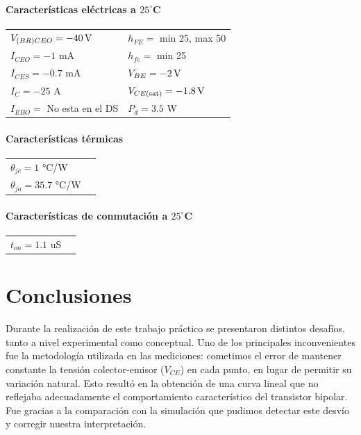 \documentclass[chaptersright]{informeutn}
\begin{document}
    \subsubsection{Características eléctricas a $25^\circ$C}
    \begin{tabular}{ll}
    $V_{(BR)CEO} = -40 \,\mathrm{V}$         & \hspace{2cm} $h_{FE} =$ min 25, max 50 \\
    $I_{CEO} = -1$ mA            & \hspace{2cm} $h_{fe} = $ min 25  \\
    $I_{CES} = -0.7$ mA               & \hspace{2cm} $V_{BE} = -2 \,\mathrm{V} $\\
    $I_C = -25$ A                & \hspace{2cm} $V_{CE(\text{sat})} = -1.8 \,\mathrm{V} $ \\
    $I_{EBO} = $ No esta en el DS              & \hspace{2cm} $P_d = 3.5$ W \\
    \end{tabular}
    
    \subsubsection{Características térmicas}
    \begin{tabular}{ll}
    $\theta_{jc} = 1$ °C/W \\
    $\theta_{ja} = 35.7$ °C/W \\
    \end{tabular}
    
    \subsubsection{Características de conmutación a $25^\circ$C}
    \begin{tabular}{ll}
    $t_{on} = 1.1$ uS  \\
    \end{tabular}



\chapter{Conclusiones}
  Durante la realización de este trabajo práctico se presentaron distintos desafíos, tanto a nivel experimental como
  conceptual. Uno de los principales inconvenientes fue la metodología utilizada en las mediciones: cometimos el error 
  de mantener constante la tensión colector-emisor ($V_{CE}$) en cada punto, en lugar de permitir su variación natural.
  Esto resultó en la obtención de una curva lineal que no reflejaba adecuadamente el comportamiento característico del 
  transistor bipolar. Fue gracias a la comparación con la simulación que pudimos detectar este desvío y corregir nuestra
  interpretación.
\end{document}
